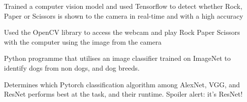 \documentclass[]{plushcv}
\begin{document}
\begin{minipage}[t]{0.70\textwidth}
\begin{tightemize}
\item Trained a computer vision model and used Tensorflow to detect whether Rock, Paper or Scissors is shown to the camera in real-time and with a high accuracy
\item Used the OpenCV library to access the webcam and play Rock Paper Scissors with the computer using the image from the camera
\end{tightemize}
\sectionsep

\begin{tightemize}
\item Python programme that utilises an image classifier trained on ImageNet to identify dogs from non dogs, and dog breeds.
\item Determines which Pytorch classification algorithm among AlexNet, VGG, and ResNet performs best at the task, and their runtime. Spoiler alert: it's ResNet!
\end{tightemize}
\sectionsep

%
%

\end{minipage} 
\hfill
\end{document}
